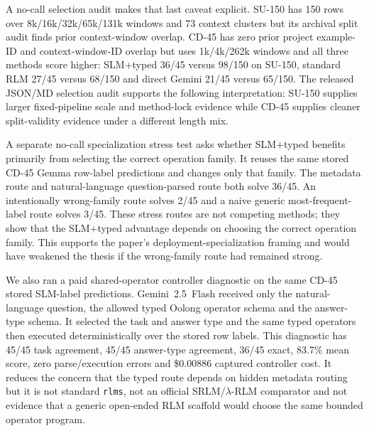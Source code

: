 A no-call selection audit makes that last caveat explicit. SU-150 has 150 rows over 8k/16k/32k/65k/131k windows and 73 context clusters but its archival split audit finds prior context-window overlap. CD-45 has zero prior project example-ID and context-window-ID overlap but uses 1k/4k/262k windows and all three methods score higher: SLM+typed 36/45 versus 98/150 on SU-150, standard RLM 27/45 versus 68/150 and direct Gemini 21/45 versus 65/150. The released JSON/MD selection audit supports the following interpretation: SU-150 supplies larger fixed-pipeline scale and method-lock evidence while CD-45 supplies cleaner split-validity evidence under a different length mix.

A separate no-call specialization stress test asks whether SLM+typed benefits primarily from selecting the correct operation family. It reuses the same stored CD-45 Gemma row-label predictions and changes only that family. The metadata route and natural-language question-parsed route both solve 36/45. An intentionally wrong-family route solves 2/45 and a naive generic most-frequent-label route solves 3/45. These stress routes are not competing methods; they show that the SLM+typed advantage depends on choosing the correct operation family. This supports the paper's deployment-specialization framing and would have weakened the thesis if the wrong-family route had remained strong.

We also ran a paid shared-operator controller diagnostic on the same CD-45 stored SLM-label predictions. Gemini~2.5~Flash received only the natural-language question, the allowed typed Oolong operator schema and the answer-type schema. It selected the task and answer type and the same typed operators then executed deterministically over the stored row labels. This diagnostic has 45/45 task agreement, 45/45 answer-type agreement, 36/45 exact, 83.7\% mean score, zero parse/execution errors and \$0.00886 captured controller cost. It reduces the concern that the typed route depends on hidden metadata routing but it is not standard \texttt{rlms}, not an official SRLM/$\lambda$-RLM comparator and not evidence that a generic open-ended RLM scaffold would choose the same bounded operator program.

